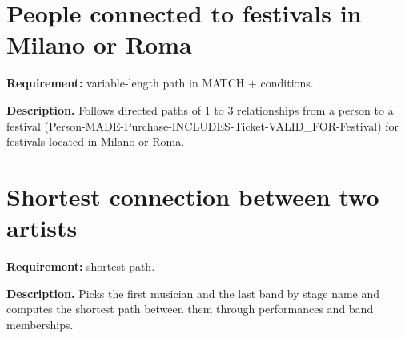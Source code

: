 \section{People connected to festivals in Milano or Roma}
\textbf{Requirement:} variable-length path in MATCH + conditions.

\textbf{Description.} Follows directed paths of 1 to 3 relationships from a person to a festival (Person-MADE-Purchase-INCLUDES-Ticket-VALID\_FOR-Festival) for festivals located in Milano or Roma. 



\section{Shortest connection between two artists}
\textbf{Requirement:} shortest path.

\textbf{Description.} Picks the first musician and the last band by stage name and computes the shortest path between them through performances and band memberships. 



